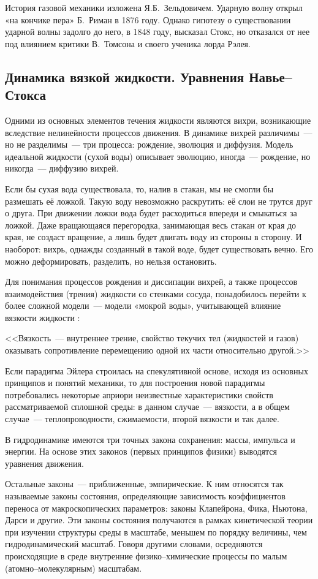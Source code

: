 История газовой механики изложена Я.Б.~Зельдовичем. Ударную волну открыл «на кончике пера» Б.~Риман в 1876 году. 
Однако гипотезу о существовании ударной волны задолго до него, в 1848 году, высказал Стокс, но отказался от 
нее под влиянием критики В.~Томсона и своего ученика лорда Рэлея.

\subsection*{Динамика вязкой жидкости. Уравнения Навье--Стокса}

Одними из основных элементов течения жидкости являются вихри, возникающие вследствие нелинейности процессов 
движения. В динамике вихрей различимы~--- но не разделимы~--- три процесса: рождение, эволюция и диффузия.
 Модель идеальной жидкости (сухой воды) описывает эволюцию, иногда~--- рождение, но никогда~--- диффузию вихрей.

Если бы сухая вода существовала, то, налив в стакан, мы не смогли бы размешать её ложкой. Такую воду невозможно 
раскрутить: её слои не трутся друг о друга. При движении ложки вода будет расходиться впереди и смыкаться за ложкой. 
Даже вращающаяся перегородка, занимающая весь стакан от края до края, не создаст вращение, а лишь будет 
двигать воду из стороны в сторону. И наоборот: вихрь, однажды созданный в такой воде, будет существовать вечно. 
Его можно деформировать, разделить, но нельзя остановить.

Для понимания процессов рождения и диссипации вихрей, а также процессов взаимодействия (трения) жидкости 
со стенками сосуда, понадобилось перейти к более сложной модели~--- модели «мокрой воды», учитывающей 
влияние вязкости жидкости \cite{wiki}:

<<Вязкость~--- внутреннее трение, свойство текучих тел (жидкостей и газов) оказывать сопротивление 
перемещению одной их части относительно другой.>>

Если парадигма Эйлера строилась на спекулятивной основе, исходя из основных принципов и понятий механики, 
то для построения новой парадигмы потребовались некоторые априори неизвестные характеристики свойств 
рассматриваемой сплошной среды: в данном случае~--- вязкости, а в общем случае~--- теплопроводности, 
сжимаемости, второй вязкости и так далее.

В гидродинамике имеются три точных закона сохранения: массы, импульса и энергии. На основе этих законов 
(первых принципов физики) выводятся уравнения движения.

Остальные законы~--- приближенные, эмпирические. К ним относятся так называемые законы состояния, 
определяющие зависимость коэффициентов переноса от макроскопических параметров: законы Клапейрона, Фика, 
Ньютона, Дарси и другие. Эти законы состояния получаются в рамках кинетической теории при изучении 
структуры среды в масштабе, меньшем по порядку величины, чем гидродинамический масштаб. Говоря другими словами, 
осредняются происходящие в среде внутренние физико--химические процессы по малым (атомно--молекулярным) масштабам.

